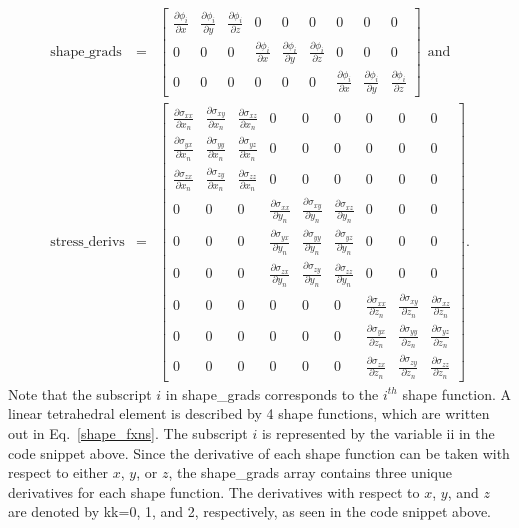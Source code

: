 \begin{eqnarray}
\text{shape\_grads} &=& 
\begin{bmatrix}
\frac{\partial \phi_i}{\partial x} & \frac{\partial \phi_i}{\partial y} & \frac{\partial \phi_i}{\partial z} & 0 & 0 & 0 & 0 & 0 & 0 \\
0 & 0 & 0 & \frac{\partial \phi_i}{\partial x} & \frac{\partial \phi_i}{\partial y} & \frac{\partial \phi_i}{\partial z} & 0 & 0 & 0 \\
0 & 0 & 0 & 0 & 0 & 0 & \frac{\partial \phi_i}{\partial x} & \frac{\partial \phi_i}{\partial y} & \frac{\partial \phi_i}{\partial z} 
\end{bmatrix} \ \ \text{and} \nonumber\\
%
\text{stress\_derivs} &=&
\begin{bmatrix}
\frac{\partial \sigma_{xx}}{\partial x_n} & \frac{\partial \sigma_{xy}}{\partial x_n} & \frac{\partial \sigma_{xz}} {\partial x_n} & 0 & 0 & 0 & 0 & 0 & 0 \\
%
\frac{\partial \sigma_{yx}}{\partial x_n} & \frac{\partial \sigma_{yy}}{\partial x_n} & \frac{\partial \sigma_{yz}} {\partial x_n} & 0 & 0 & 0 & 0 & 0 & 0 \\
%
\frac{\partial \sigma_{zx}}{\partial x_n} & \frac{\partial \sigma_{zy}}{\partial x_n} & \frac{\partial \sigma_{zz}} {\partial x_n} & 0 & 0 & 0 & 0 & 0 & 0 \\
0 & 0 & 0 & \frac{\partial \sigma_{xx}}{\partial y_n} & \frac{\partial \sigma_{xy}}{\partial y_n} & \frac{\partial \sigma_{xz}} {\partial y_n} &  0 & 0 & 0 \\
%
0 & 0 & 0 & \frac{\partial \sigma_{yx}}{\partial y_n} & \frac{\partial \sigma_{yy}}{\partial y_n} & \frac{\partial \sigma_{yz}} {\partial y_n} &  0 & 0 & 0 \\
%
0 & 0 & 0 & \frac{\partial \sigma_{zx}}{\partial y_n} & \frac{\partial \sigma_{zy}}{\partial y_n} & \frac{\partial \sigma_{zz}} {\partial y_n} &  0 & 0 & 0 \\
0 & 0 & 0 &  0 & 0 & 0 & \frac{\partial \sigma_{xx}}{\partial z_n} & \frac{\partial \sigma_{xy}}{\partial z_n} & \frac{\partial \sigma_{xz}} {\partial z_n}  \\
%
0 & 0 & 0 &  0 & 0 & 0 & \frac{\partial \sigma_{yx}}{\partial z_n} & \frac{\partial \sigma_{yy}}{\partial z_n} & \frac{\partial \sigma_{yz}} {\partial z_n}  \\
%
0 & 0 & 0 &  0 & 0 & 0 & \frac{\partial \sigma_{zx}}{\partial z_n} & \frac{\partial \sigma_{zy}}{\partial z_n} & \frac{\partial \sigma_{zz}} {\partial z_n}  
\end{bmatrix}.
\end{eqnarray}
%
Note that the subscript $i$ in shape\_grads corresponds to the $i^{th}$ shape function. A linear tetrahedral element is described by 4 shape functions, which are written out in Eq.\ \eqref{shape_fxns}. The subscript $i$ is represented by the variable ii in the code snippet above. Since the derivative of each shape function can be taken with respect to either $x$, $y$, or $z$, the shape\_grads array contains three unique derivatives for each shape function. The derivatives with respect to $x$, $y$, and $z$ are denoted by kk=0, 1, and 2, respectively, as seen in the code snippet above.   

